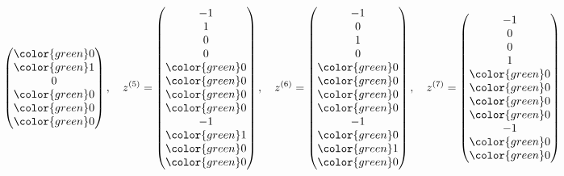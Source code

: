 \begin{loesung}
\[\begin{pmatrix}
\color{green} 0\\
\color{green} 1\\
              0\\
\color{green} 0\\
\color{green} 0\\
\color{green} 0
\end{pmatrix}
,\quad
z^{(5)}=
\begin{pmatrix}
             -1\\
              1\\
              0\\
              0\\
\color{green} 0\\
\color{green} 0\\
\color{green} 0\\
\color{green} 0\\
             -1\\
\color{green} 1\\
\color{green} 0\\
\color{green} 0
\end{pmatrix}
,\quad
z^{(6)}=\begin{pmatrix}
             -1\\
              0\\
              1\\
              0\\
\color{green} 0\\
\color{green} 0\\
\color{green} 0\\
\color{green} 0\\
             -1\\
\color{green} 0\\
\color{green} 1\\
\color{green} 0
\end{pmatrix}
,\quad
z^{(7)}=\begin{pmatrix}
             -1\\
              0\\
              0\\
              1\\
\color{green} 0\\
\color{green} 0\\
\color{green} 0\\
\color{green} 0\\
             -1\\
\color{green} 0\\
\color{green} 0\\

\end{pmatrix}\]
\end{loesung}

